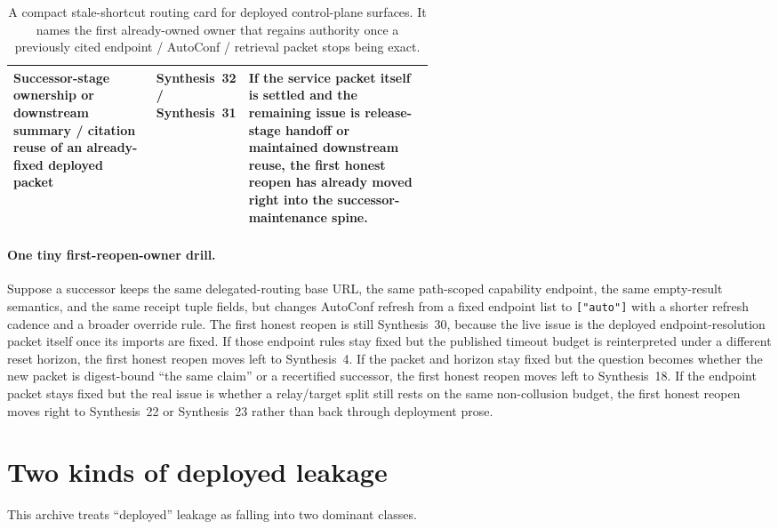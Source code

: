 \documentclass[11pt]{article}
\begin{document}
\begin{table}[t]
\begin{tabularx}{0.98\linewidth}{@{}p{0.34\linewidth}p{0.21\linewidth}X@{}}
Successor-stage ownership or downstream summary / citation reuse of an already-fixed deployed packet & Synthesis~32 / Synthesis~31 & If the service packet itself is settled and the remaining issue is release-stage handoff or maintained downstream reuse, the first honest reopen has already moved right into the successor-maintenance spine.\\
\bottomrule
\end{tabularx}
\caption{A compact stale-shortcut routing card for deployed control-plane surfaces. It names the first already-owned owner that regains authority once a previously cited endpoint / AutoConf / retrieval packet stops being exact.}
\label{tab:deployedsurfaces-first-reopen-owner}
\end{table}

\paragraph{One tiny first-reopen-owner drill.}
Suppose a successor keeps the same delegated-routing base URL, the same path-scoped capability endpoint, the same empty-result semantics, and the same receipt tuple fields, but changes AutoConf refresh from a fixed endpoint list to \texttt{["auto"]} with a shorter refresh cadence and a broader override rule. The first honest reopen is still Synthesis~30, because the live issue is the deployed endpoint-resolution packet itself once its imports are fixed. If those endpoint rules stay fixed but the published timeout budget is reinterpreted under a different reset horizon, the first honest reopen moves left to Synthesis~4. If the packet and horizon stay fixed but the question becomes whether the new packet is digest-bound ``the same claim'' or a recertified successor, the first honest reopen moves left to Synthesis~18. If the endpoint packet stays fixed but the real issue is whether a relay/target split still rests on the same non-collusion budget, the first honest reopen moves right to Synthesis~22 or Synthesis~23 rather than back through deployment prose.\cite{series:traceifaces,series:threatwindows,series:receiptitems,series:planstateequiv,series:auditorreplay,series:primarysepmanifest,series:probsep,series:releasespine,series:downstreamnormalforms}

\section{Two kinds of deployed leakage}
This archive treats ``deployed'' leakage as falling into two dominant classes.
\end{document}

